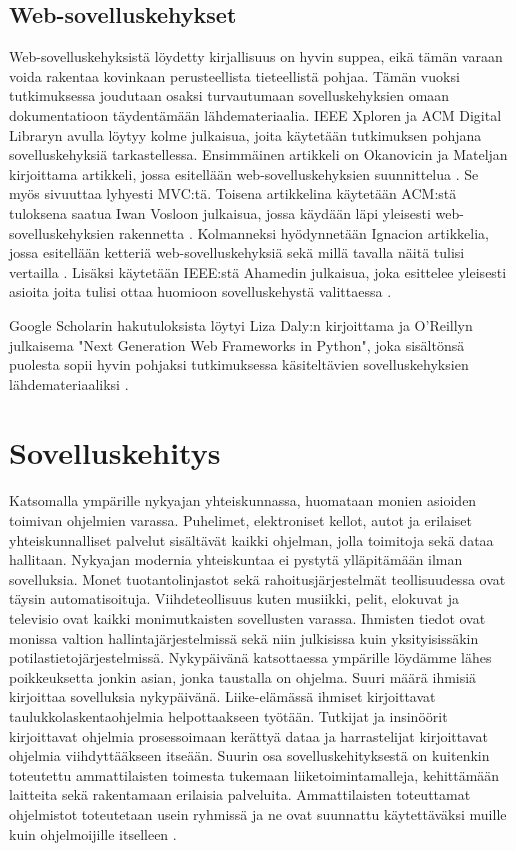 \documentclass[utf8]{gradu3}
\begin{document}
\section{Web-sovelluskehykset}
Web-sovelluskehyksistä löydetty kirjallisuus on hyvin
suppea, eikä tämän varaan voida rakentaa kovinkaan perusteellista
tieteellistä pohjaa. Tämän vuoksi tutkimuksessa joudutaan osaksi turvautumaan
sovelluskehyksien omaan dokumentatioon täydentämään
lähdemateriaalia. IEEE Xploren ja ACM Digital Libraryn avulla löytyy kolme julkaisua, 
joita käytetään tutkimuksen pohjana sovelluskehyksiä
tarkastellessa. Ensimmäinen artikkeli on Okanovicin ja Mateljan
kirjoittama artikkeli, jossa esitellään web-sovelluskehyksien suunnittelua \parencite{ockanovic}. 
Se myös sivuuttaa lyhyesti MVC:tä. Toisena artikkelina käytetään ACM:stä tuloksena saatua Iwan
Vosloon julkaisua, jossa käydään läpi yleisesti web-sovelluskehyksien
rakennetta \parencite{vosloo}. Kolmanneksi hyödynnetään Ignacion artikkelia, jossa esitellään ketteriä
web-sovelluskehyksiä sekä millä tavalla näitä tulisi vertailla \parencite{ignacio}. Lisäksi käytetään
IEEE:stä Ahamedin julkaisua, joka esittelee yleisesti asioita joita tulisi ottaa huomioon sovelluskehystä 
valittaessa \parencite{towards_framework}.

Google Scholarin hakutuloksista löytyi Liza Daly:n
kirjoittama ja O'Reillyn julkaisema "Next Generation Web Frameworks
in Python", joka sisältönsä puolesta sopii hyvin pohjaksi
tutkimuksessa käsiteltävien sovelluskehyksien lähdemateriaaliksi 
\parencite{liza}.

\chapter{Sovelluskehitys}


Katsomalla ympärille nykyajan yhteiskunnassa, huomataan monien asioiden toimivan ohjelmien varassa. Puhelimet, elektroniset kellot, autot ja erilaiset yhteiskunnalliset palvelut sisältävät kaikki ohjelman, jolla toimitoja sekä dataa hallitaan. Nykyajan modernia yhteiskuntaa ei pystytä ylläpitämään ilman sovelluksia. Monet tuotantolinjastot sekä rahoitusjärjestelmät teollisuudessa ovat täysin automatisoituja. Viihdeteollisuus kuten musiikki, pelit, elokuvat ja televisio ovat kaikki monimutkaisten sovellusten varassa. Ihmisten tiedot ovat monissa valtion hallintajärjestelmissä sekä niin julkisissa kuin yksityisissäkin potilastietojärjestelmissä. Nykypäivänä katsottaessa ympärille löydämme lähes poikkeuksetta jonkin asian, jonka taustalla on ohjelma. Suuri määrä ihmisiä kirjoittaa sovelluksia nykypäivänä. Liike-elämässä ihmiset kirjoittavat taulukkolaskentaohjelmia helpottaakseen työtään. Tutkijat ja insinöörit kirjoittavat ohjelmia prosessoimaan kerättyä dataa ja harrastelijat kirjoittavat ohjelmia viihdyttääkseen itseään. Suurin osa sovelluskehityksestä on kuitenkin toteutettu ammattilaisten toimesta tukemaan liiketoimintamalleja, kehittämään laitteita sekä rakentamaan erilaisia palveluita. Ammattilaisten toteuttamat ohjelmistot toteutetaan usein ryhmissä ja ne ovat suunnattu käytettäväksi muille kuin ohjelmoijille itselleen \parencite{Sommerville}.
\end{document}
